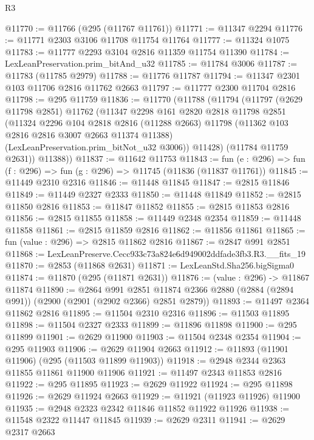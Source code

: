 \begin{lexlean}{R3}
\begin{coremodule}
@11770 := @11766 (@295 (@11767 @11761))
@11771 := @11347 @2294
@11776 := @11771 @2303 @3106 @11708 @11754 @11764
@11777 := @11324 @1075
@11783 := @11777 @2293 @3104 @2816 @11359 @11754 @11390
@11784 := LexLeanPreservation.prim_bitAnd_u32
@11785 := @11784 @3006
@11787 := @11783 (@11785 @2979)
@11788 := @11776 @11787
@11794 := @11347 @2301 @103 @11706 @2816 @11762 @2663
@11797 := @11777 @2300 @11704 @2816
@11798 := @295 @11759
@11836 := @11770
    (@11788
      (@11794
        (@11797
          (@2629 @11798 @2851)
          @11762
          (@11347
            @2298
            @161
            @2820
            @2818
            @11798
            @2851
            (@11324
              @2296
              @104
              @2818
              @2816
              (@11288 @2663)
              @11798
              (@11362 @103 @2816 @2816 @3007 @2663 @11374 @11388)
              (LexLeanPreservation.prim_bitNot_u32 @3006))
            @11428)
          (@11784 @11759 @2631))
        @11388))
@11837 := @11642 @11753
@11843 := fun (e : @296) => fun (f : @296) => fun (g : @296) => @11745 (@11836 (@11837 @11761))
@11845 := @11449 @2310 @2316
@11846 := @11448 @11845
@11847 := @2815 @11846
@11849 := @11449 @2327 @2333
@11850 := @11448 @11849
@11852 := @2815 @11850 @2816
@11853 := @11847 @11852
@11855 := @2815 @11853 @2816
@11856 := @2815 @11855
@11858 := @11449 @2348 @2354
@11859 := @11448 @11858
@11861 := @2815 @11859 @2816
@11862 := @11856 @11861
@11865 := fun (value : @296) => @2815 @11862 @2816
@11867 := @2847 @991 @2851
@11868 := LexLeanPreserve.Cecc933c73a824e6d949002ddfade3fb3.R3.__fits_19
@11870 := @2853 (@11868 @2631)
@11871 := LexLeanStd.Sha256.bigSigma0
@11874 := @11870 (@295 (@11871 @2631))
@11876 := (value : @296) -> @11867 @11874
@11890 := @2864
    @991
    @2851
    @11874
    @2366
    @2880
    (@2884 (@2894 @991))
    (@2900 (@2901 (@2902 @2366) @2851 @2879))
@11893 := @11497 @2364 @11862 @2816
@11895 := @11504 @2310 @2316
@11896 := @11503 @11895
@11898 := @11504 @2327 @2333
@11899 := @11896 @11898
@11900 := @295 @11899
@11901 := @2629 @11900
@11903 := @11504 @2348 @2354
@11904 := @295 @11903
@11906 := @2629 @11904 @2663
@11912 := @11893 (@11901 @11906) (@295 (@11503 @11899 @11903))
@11918 := @2948 @2344 @2363 @11855 @11861 @11900 @11906
@11921 := @11497 @2343 @11853 @2816
@11922 := @295 @11895
@11923 := @2629 @11922
@11924 := @295 @11898
@11926 := @2629 @11924 @2663
@11929 := @11921 (@11923 @11926) @11900
@11935 := @2948 @2323 @2342 @11846 @11852 @11922 @11926
@11938 := @11548 @2322 @11447 @11845
@11939 := @2629 @2311
@11941 := @2629 @2317 @2663

\end{coremodule}
\end{lexlean}
